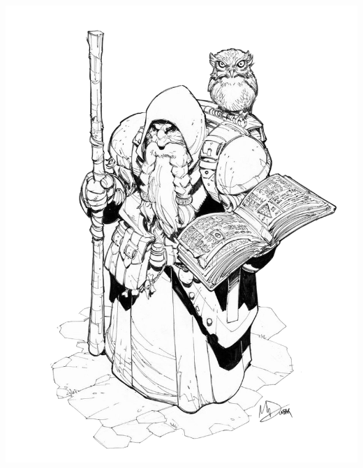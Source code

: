 \begin{multicols*}{2}
\begin{Figure}
\centering
\includegraphics[width=\textwidth]{img/wizard-2.png}
\end{Figure}
    
\end{multicols*}

    